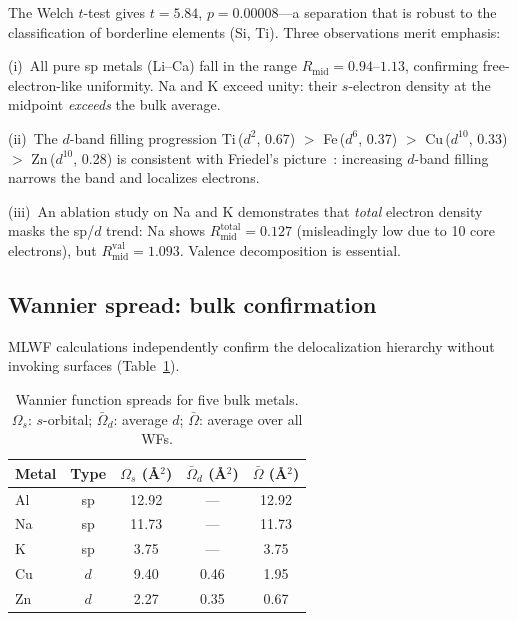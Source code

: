 \documentclass[twocolumn,showpacs,preprintnumbers,amsmath,amssymb,prb]{revtex4-2}
\begin{document}
The Welch $t$-test gives $t = 5.84$, $p = 0.00008$---a
separation that is robust to the classification of borderline
elements (Si, Ti).
Three observations merit emphasis:

(i)~All pure sp metals (Li--Ca) fall in the range
$R_\mathrm{mid} = 0.94$--$1.13$, confirming free-electron-like
uniformity.
Na and K exceed unity: their $s$-electron density at
the midpoint \emph{exceeds} the bulk average.

(ii)~The $d$-band filling progression
Ti\,($d^2$, 0.67) $>$ Fe\,($d^6$, 0.37)
$>$ Cu\,($d^{10}$, 0.33) $>$ Zn\,($d^{10}$, 0.28)
is consistent with Friedel's picture~\cite{Friedel1969}:
increasing $d$-band filling narrows the band and
localizes electrons.

(iii)~An ablation study on Na and K demonstrates that
\emph{total} electron density masks the sp/$d$ trend:
Na shows $R_\mathrm{mid}^\mathrm{total} = 0.127$
(misleadingly low due to 10 core electrons), but
$R_\mathrm{mid}^\mathrm{val} = 1.093$.
Valence decomposition is essential.


\subsection{Wannier spread: bulk confirmation}

MLWF calculations independently confirm the delocalization
hierarchy without invoking surfaces
(Table~\ref{tab:wannier}).

\begin{table}[htb]
  \centering
  \caption{Wannier function spreads for five bulk metals.
    $\Omega_s$: $s$-orbital; $\bar{\Omega}_d$: average $d$;
    $\bar{\Omega}$: average over all WFs.}
  \label{tab:wannier}
  \begin{ruledtabular}
  \begin{tabular}{lcccc}
    Metal & Type & $\Omega_s$ (\AA$^2$) &
      $\bar{\Omega}_d$ (\AA$^2$) &
      $\bar{\Omega}$ (\AA$^2$) \\
    \hline
    Al & sp & 12.92 & --- & 12.92 \\
    Na & sp & 11.73 & --- & 11.73 \\
    K  & sp &  3.75 & --- &  3.75 \\
    Cu & $d$ &  9.40 & 0.46 & 1.95 \\
    Zn & $d$ &  2.27 & 0.35 & 0.67 \\
  \end{tabular}
  \end{ruledtabular}
\end{table}
\end{document}
